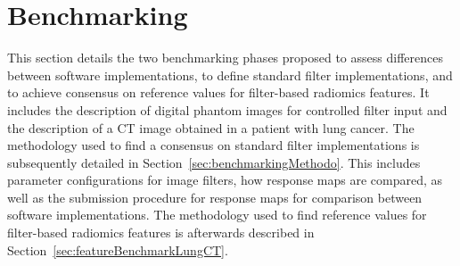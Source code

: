 \documentclass[fleqn,a4paper,oneside,openany]{book}
\begin{document}
\chapter{Benchmarking}\label{sec:benchmarking}
%
This section details the two benchmarking phases proposed to assess differences between software implementations, to define standard filter implementations, and to achieve consensus on reference values for filter-based radiomics features.
It includes the description of digital phantom images for controlled filter input and the description of a CT image obtained in a patient with lung cancer.
The methodology used to find a consensus on standard filter implementations is subsequently detailed in Section~\ref{sec:benchmarkingMethodo}. This includes parameter configurations for image filters, how response maps are compared, as well as the submission procedure for response maps for comparison between software implementations.
The methodology used to find reference values for filter-based radiomics features is afterwards described in Section~\ref{sec:featureBenchmarkLungCT}.
%
\end{document}
